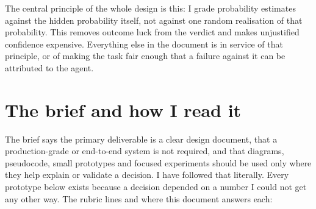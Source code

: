 \documentclass[11pt,letterpaper]{article}
\begin{document}
The central principle of the whole design is this: I grade probability estimates against the hidden probability itself, not against one random realisation of that probability. This removes outcome luck from the verdict and makes unjustified confidence expensive. Everything else in the document is in service of that principle, or of making the task fair enough that a failure against it can be attributed to the agent.


\section{The brief and how I read it}

The brief says the primary deliverable is a clear design document, that a production-grade or end-to-end system is not required, and that diagrams, pseudocode, small prototypes and focused experiments should be used only where they help explain or validate a decision. I have followed that literally. Every prototype below exists because a decision depended on a number I could not get any other way. The rubric lines and where this document answers each:
\end{document}
